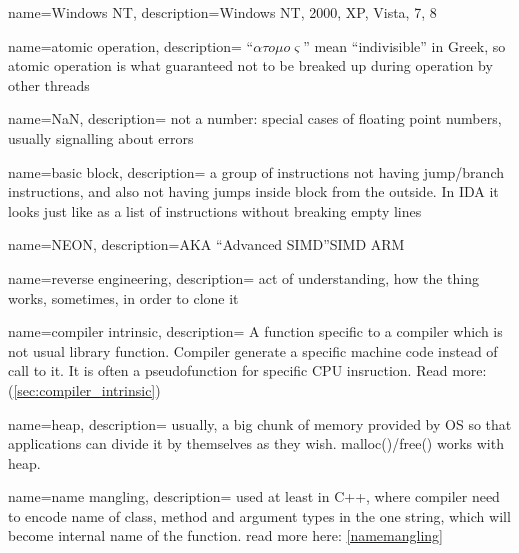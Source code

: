 {
  name=Windows NT,
  description={Windows NT, 2000, XP, Vista, 7, 8}
}

{
  name=atomic operation,
  description={
  ``$\alpha{}\tau{}o\mu{}o\varsigma{}$''
  {mean ``indivisible'' in Greek, so atomic operation is what guaranteed not
  to be breaked up during operation by other threads}}
}

{
  name=NaN,
  description={
	{not a number: special cases of floating point numbers, usually signalling about errors}
  }
}

{
  name=basic block,
  description={
	{a group of instructions not having jump/branch instructions, and also not having
	jumps inside block from the outside.
	In IDA it looks just like as a list of instructions without breaking empty lines}
  }
}

{
  name=NEON,
  description={\ac{AKA} ``Advanced SIMD''\EMDASH\ac{SIMD}  ARM}
}

{
  name=reverse engineering,
  description={
  {act of understanding, how the thing works, sometimes, in order to clone it}}
}

{
  name=compiler intrinsic,
  description={
	{A function specific to a compiler which is not usual library function.
	Compiler generate a specific machine code instead of call to it.
	It is often a pseudofunction for specific \ac{CPU} insruction. Read more:} (\ref{sec:compiler_intrinsic})}
}

{
  name=heap,
  description={
  {usually, a big chunk of memory provided by \ac{OS} so that applications can divide it by themselves as they wish.
  malloc()/free() works with heap.}}
}

{
  name=name mangling,
  description={
  {used at least in C++, where compiler need to encode name of class, method and argument types in the one string,
  which will become internal name of the function. read more here}: \ref{namemangling}}
}


